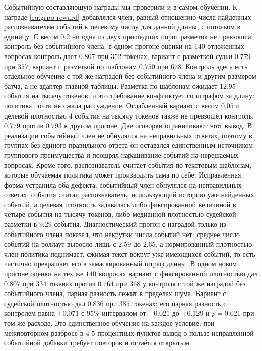 \documentclass[11pt]{article}
\begin{document}
Событийную составляющую награды мы проверили и в самом обучении. К награде \eqref{eq:grpo-reward} добавлялся член, равный отношению числа найденных распознавателем событий к целевому числу для данной длины, с потолком в единицу. С весом $0.2$ ни одна из двух прошедших порог разметок не превзошла контроль без событийного члена: в одном прогоне оценки на $140$ отложенных вопросах контроль даёт $0.807$ при $352$ токенах, вариант с разметкой судьи $0.779$ при $357$, вариант с разметкой по шаблонам $0.750$ при $678$. Контроль здесь есть отдельное обучение с той же наградой без событийного члена и другим размером батча, а не адаптер главной таблицы. Разметка по шаблонам ожидает $12.95$ события на тысячу токенов, и это требование конфликтует со штрафом за длину: политика почти не сжала рассуждение. Ослабленный вариант с весом $0.05$ и целевой плотностью $4$ события на тысячу токенов также не превзошёл контроль, $0.779$ против $0.793$ в другом прогоне. Две оговорки ограничивают этот вывод. В реализации событийный член не обнулялся на неправильных ответах, поэтому в группах без единого правильного ответа он оставался единственным источником группового преимущества и поощрял наращивание событий на нерешаемых вопросах. Кроме того, распознаватель считает события по текстовым шаблонам, которые обучаемая политика может производить сама по себе. Исправленная форма устранила оба дефекта: событийный член обнулялся на неправильных ответах, события считал распознаватель, использующий историю уже найденных событий, а целевая плотность задавалась либо фиксированной величиной в четыре события на тысячу токенов, либо медианной плотностью судейской разметки в $9.29$ события. Диагностический прогон с наградой только из событийного члена показал, что накрутки числа событий нет: среднее число событий на роллаут выросло лишь с $2.59$ до $2.65$, а нормированный плотностью член политика поднимает, сжимая текст вокруг уже имеющихся событий, то есть частично превращает его в замаскированный штраф длины. В одном новом прогоне оценки на тех же $140$ вопросах вариант с фиксированной плотностью дал $0.807$ при $334$ токенах против $0.764$ при $368$ у контроля с той же наградой без событийного члена, парная разность лежит в пределах шума. Вариант с судейской плотностью дал $0.836$ при $385$ токенах; его парная разность с контролем равна $+0.071$ с $95\%$ интервалом от $+0.021$ до $+0.129$ и $p=0.021$ при том же расходе. Это единственное обучение на каждое условие: при межповторном разбросе в $4$-$5$ процентных пунктов вывод о пользе исправленной событийной добавки требует повторов и остаётся открытым.
\end{document}
